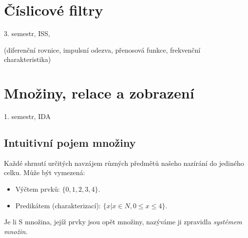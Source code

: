 \documentclass[a4paper, 11pt]{report}
\begin{document}
\chapter{Číslicové filtry} \label{cha:15}

3. semestr, ISS, 

(diferenční rovnice, impulsní odezva, přenosová funkce, frekvenční charakteristika)





































\chapter{Množiny, relace a zobrazení} \label{cha:16}

1. semestr, IDA

\section{Intuitivní pojem množiny}

Každé shrnutí určitých navzájem různých předmětů našeho nazírání do jediného celku. Může být vymezená:
\begin{itemize}
	\item Výčtem prvků: $\{0, 1, 2, 3, 4\}$.
	\item Predikátem (charakterizací): $\{x | x \in N, 0 \leq x \leq 4\}$.
\end{itemize}

Je li S množina, jejíž prvky jsou opět množiny, nazýváme ji zpravidla \emph{systémem množin}.
\end{document}
